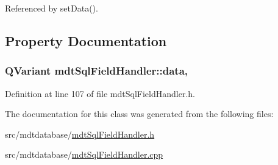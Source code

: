 Referenced by set\-Data().



\subsection{Property Documentation}
\hypertarget{classmdt_sql_field_handler_a87e0184853f31ac3236a6b05179192c8}{
\subsubsection[{data}]{\setlength{\rightskip}{0pt plus 5cm}Q\-Variant mdt\-Sql\-Field\-Handler\-::data\hspace{0.3cm}{\ttfamily [read]}, {\ttfamily [write]}}}\label{classmdt_sql_field_handler_a87e0184853f31ac3236a6b05179192c8}


Definition at line 107 of file mdt\-Sql\-Field\-Handler.\-h.



The documentation for this class was generated from the following files\-:\begin{DoxyCompactItemize}
\item 
src/mdtdatabase/\hyperlink{mdt_sql_field_handler_8h}{mdt\-Sql\-Field\-Handler.\-h}\item 
src/mdtdatabase/\hyperlink{mdt_sql_field_handler_8cpp}{mdt\-Sql\-Field\-Handler.\-cpp}\end{DoxyCompactItemize}
